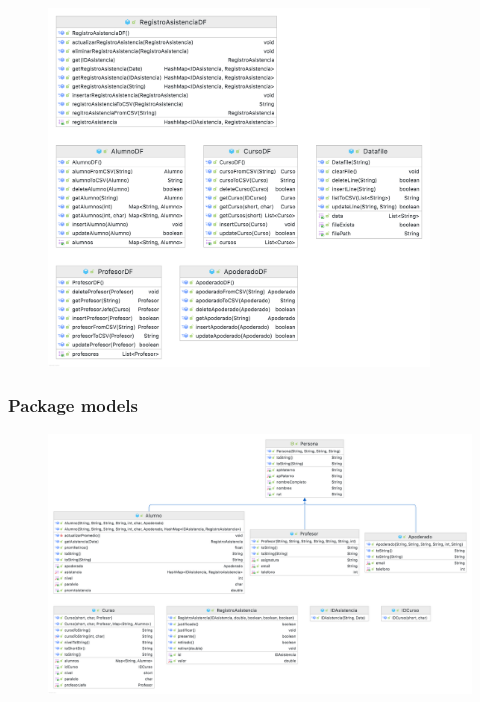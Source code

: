 \begin{figure}[h]
    \centering
    \includegraphics[width=0.9\textwidth]{contents/img/paq/data.datafile}
\end{figure}

\clearpage

\subsubsection*{Package models}

\begin{figure}[h]
    \centering
    \includegraphics[width=1\textwidth]{contents/img/paq/models}
\end{figure}

\clearpage

